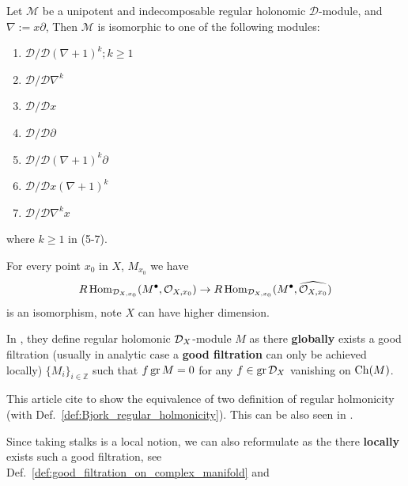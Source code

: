 \begin{remark}
\begin{proposition}[Classification of unipotent indecomposable regular holonomic $\D :=\mathcal{D}_1$-modules]
        Let $\mathcal{M}$ be a unipotent and indecomposable regular holonomic $\mathcal{D}$-module, and $\nabla := x\partial$,
        Then $\mathcal{M}$ is isomorphic to one of the following modules:
        \begin{enumerate}
            \item $\mathcal{D}/\mathcal{D}(\nabla + 1)^k; k \geq 1$
            \item $\mathcal{D}/\mathcal{D}\nabla^k$
            \item $\mathcal{D}/\mathcal{D}x$
            \item $\mathcal{D}/\mathcal{D}\partial$
            \item $\mathcal{D}/\mathcal{D}(\nabla + 1)^k\partial$
            \item $\mathcal{D}/\mathcal{D}x(\nabla + 1)^k$
            \item $\mathcal{D}/\mathcal{D}\nabla^k x$
        \end{enumerate}
        where $k \geq 1$ in (5-7).
    \end{proposition}

    \begin{definition}\label{def:Bjork_regular_holmonicity}
        \cite[Definition~5.3.1.]{Bjork1993AnalyticDModules}
        For every point $x_0$ in $X$, $M_{x_0}$ we have
        \[
            R\operatorname{Hom}_{\mathcal{D}_{X,x_0}}(M^\bullet,\mathcal{O}_{X,x_0})\rightarrow  R\operatorname{Hom}_{\mathcal{D}_{X,x_0}}(M^\bullet,\widehat{\mathcal{O}_{X,x_0}})
        \]
        is an isomorphism, note $X$ can have higher dimension.
    \end{definition}

    \begin{proposition}
        In \cite[Definition~5.2.]{Kashiwara1984RiemannHilbertHolonomic},
        they define regular holomonic $\mathcal{D}_X$-module $M$ as there \textbf{globally} exists a good filtration
        (usually in analytic case a \textbf{good filtration} can only be achieved locally) $\{M_i\}_{i\in\mathbb{Z}}$ such that $f\operatorname{gr} M = 0$ for any $f\in\operatorname{gr}\mathcal{D}_X$
        vanishing on $\operatorname{Ch}(M)$.

        This article cite \cite[Thm.~6.3.1 and Thm.~6.4.1]{KashiwaraKawai1981HolIII} to show the equivalence of two definition of
        regular holmonicity (with Def.~\ref{def:Bjork_regular_holmonicity}). This can be also seen in \cite[Rmk.~7.3.2.]{hotta2008d}.

        Since taking stalks is a local notion, we can also reformulate \cite[Definition~5.2.]{Kashiwara1984RiemannHilbertHolonomic} as
        the there \textbf{locally} exists such a good filtration, see Def.~\ref{def:good_filtration_on_complex_manifold} and \cite[Def.~6.1.8.]{hotta2008d}
    \end{proposition}


\end{remark}
